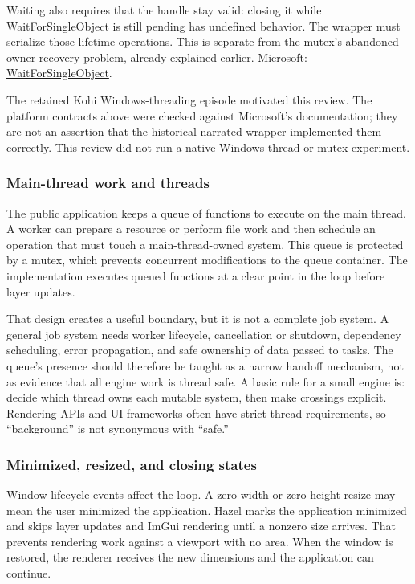 Waiting also requires that the handle stay valid: closing it while WaitForSingleObject is still pending has undefined behavior. The wrapper must serialize those lifetime operations. This is separate from the mutex's abandoned-owner recovery problem, already explained earlier. \href{https://learn.microsoft.com/en-us/windows/win32/api/synchapi/nf-synchapi-waitforsingleobject}{Microsoft: WaitForSingleObject}.

The retained Kohi Windows-threading episode motivated this review. The platform contracts above were checked against Microsoft's documentation; they are not an assertion that the historical narrated wrapper implemented them correctly. This review did not run a native Windows thread or mutex experiment.

\subsubsection{Main-thread work and threads}\label{05-engine-i-ch013-main-thread-work-and-threads}

The public application keeps a queue of functions to execute on the main thread. A worker can prepare a resource or perform file work and then schedule an operation that must touch a main-thread-owned system. This queue is protected by a mutex, which prevents concurrent modifications to the queue container. The implementation executes queued functions at a clear point in the loop before layer updates.

That design creates a useful boundary, but it is not a complete job system. A general job system needs worker lifecycle, cancellation or shutdown, dependency scheduling, error propagation, and safe ownership of data passed to tasks. The queue's presence should therefore be taught as a narrow handoff mechanism, not as evidence that all engine work is thread safe. A basic rule for a small engine is: decide which thread owns each mutable system, then make crossings explicit. Rendering APIs and UI frameworks often have strict thread requirements, so ``background'' is not synonymous with ``safe.''

\subsubsection{Minimized, resized, and closing states}\label{05-engine-i-ch013-minimized-resized-and-closing-states}

Window lifecycle events affect the loop. A zero-width or zero-height resize may mean the user minimized the application. Hazel marks the application minimized and skips layer updates and ImGui rendering until a nonzero size arrives. That prevents rendering work against a viewport with no area. When the window is restored, the renderer receives the new dimensions and the application can continue.

